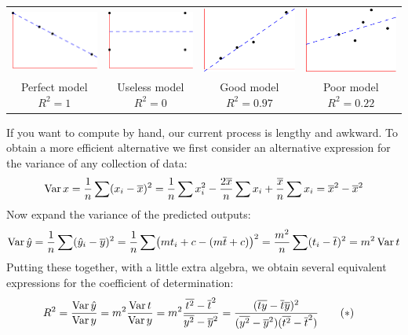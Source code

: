 \begin{center}
	\begin{tabular}{@{}c@{\quad\ }c@{\quad\ }c@{\quad\ }c@{}}
		\includegraphics{reg-rsq1}
		&
		\includegraphics{reg-rsq2}
		&
		\includegraphics{reg-rsq3}
		&
		\includegraphics{reg-rsq4}
		\\
		Perfect model $R^2=1$
		&
		Useless model $R^2=0$
		&
		Good model $R^2=0.97$
		&
		Poor model $R^2=0.22$
	\end{tabular}
\end{center}



If you want to compute by hand, our current process is lengthy and awkward. To obtain a more efficient alternative we first consider an alternative expression for the variance of any collection of data:
\[
	\operatorname{Var} x=\frac 1n\sum(x_i-\overline{x})^2=\frac 1n\sum x_i^2-\frac{2\overline{x}}n\sum x_i+\frac{\overline{x}}n\sum x_i =\overline{x}^2-\overline{x}^2
\]
Now expand the variance of the predicted outputs:
\[
	\operatorname{Var}\hat y=\frac 1n\sum(\hat y_i-\overline{y})^2=\frac 1n\sum\bigl(mt_i+c-(m\overline{t}+c)\bigr)^2 =\frac{m^2}n\sum(t_i-\overline{t})^2=m^2\operatorname{Var} t
\]
Putting these together, with a little extra algebra, we obtain several equivalent expressions for the coefficient of determination:\label{pg:rsqalt}
\begin{align*}
	R^2&=\frac{\operatorname{Var}\hat y}{\operatorname{Var} y} =m^2\frac{\operatorname{Var} t}{\operatorname{Var} y} = m^2\frac{\overline{t^2}-\overline{t}^2}{\overline{y^2}-\overline{y}^2} = \frac{(\overline{ty}-\overline{t}\overline{y})^2}{(\overline{y^2}-\overline{y}^2)(\overline{t^2}-\overline{t}^2)}
\tag{$\ast$}
\end{align*}

